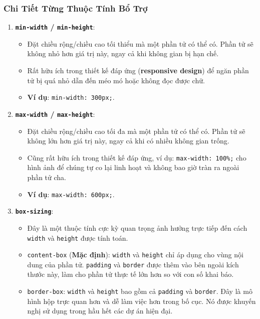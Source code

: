 \documentclass[11pt,oneside]{book}
\newcommand{\codeinline}[1]{\textcolor{accentOrange}{\texttt{#1}}}
\newcommand{\term}[1]{\textbf{\textcolor{primaryBlue}{#1}}}
\begin{document}
\subsubsection{Chi Tiết Từng Thuộc Tính Bổ Trợ}

\begin{enumerate}[leftmargin=1.5em, itemsep=6pt, parsep=0pt]
    \item \textbf{\codeinline{min-width} / \codeinline{min-height}}:
    \begin{itemize}[leftmargin=1.2em, itemsep=2pt, parsep=0pt]
        \item Đặt chiều rộng/chiều cao tối thiểu mà một phần tử có thể có. Phần tử sẽ không nhỏ hơn giá trị này, ngay cả khi không gian bị hạn chế.
        \item Rất hữu ích trong thiết kế đáp ứng (\term{responsive design}) để ngăn phần tử bị quá nhỏ dẫn đến méo mó hoặc không đọc được chữ.
        \item \textbf{Ví dụ}: \codeinline{min-width: 300px;}.
    \end{itemize}

    \item \textbf{\codeinline{max-width} / \codeinline{max-height}}:
    \begin{itemize}[leftmargin=1.2em, itemsep=2pt, parsep=0pt]
        \item Đặt chiều rộng/chiều cao tối đa mà một phần tử có thể có. Phần tử sẽ không lớn hơn giá trị này, ngay cả khi có nhiều không gian trống.
        \item Cũng rất hữu ích trong thiết kế đáp ứng, ví dụ: \codeinline{max-width: 100\%;} cho hình ảnh để chúng tự co lại linh hoạt và không bao giờ tràn ra ngoài phần tử cha.
        \item \textbf{Ví dụ}: \codeinline{max-width: 600px;}.
    \end{itemize}

    \item \textbf{\codeinline{box-sizing}}:
    \begin{itemize}[leftmargin=1.2em, itemsep=2pt, parsep=0pt]
        \item Đây là một thuộc tính cực kỳ quan trọng ảnh hưởng trực tiếp đến cách \codeinline{width} và \codeinline{height} được tính toán.
        \item \codeinline{content-box} (\textbf{Mặc định}): \codeinline{width} và \codeinline{height} chỉ áp dụng cho vùng nội dung của phần tử. \codeinline{padding} và \codeinline{border} được thêm vào bên ngoài kích thước này, làm cho phần tử thực tế lớn hơn so với con số khai báo.
        \item \codeinline{border-box}: \codeinline{width} và \codeinline{height} bao gồm cả \codeinline{padding} và \codeinline{border}. Đây là mô hình hộp trực quan hơn và dễ làm việc hơn trong bố cục. Nó được khuyến nghị sử dụng trong hầu hết các dự án hiện đại.
    \end{itemize}


\end{enumerate}
\end{document}
